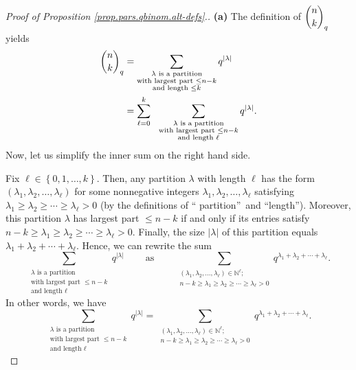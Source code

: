\begin{proof}
[Proof of Proposition \ref{prop.pars.qbinom.alt-defs}.]\textbf{(a)} The
definition of $\dbinom{n}{k}_{q}$ yields%
\begin{align}
\dbinom{n}{k}_{q}  &  =\sum_{\substack{\lambda\text{ is a partition}%
\\\text{with largest part }\leq n-k\\\text{and length }\leq k}}q^{\left\vert
\lambda\right\vert }\nonumber\\
&  =\sum_{\ell=0}^{k}\ \ \sum_{\substack{\lambda\text{ is a partition}%
\\\text{with largest part }\leq n-k\\\text{and length }\ell}}q^{\left\vert
\lambda\right\vert }. \label{pf.prop.pars.qbinom.alt-defs.a.1}%
\end{align}
Now, let us simplify the inner sum on the right hand side.

Fix $\ell\in\left\{  0,1,\ldots,k\right\}  $. Then, any partition $\lambda$
with length $\ell$ has the form $\left(  \lambda_{1},\lambda_{2}%
,\ldots,\lambda_{\ell}\right)  $ for some nonnegative integers $\lambda
_{1},\lambda_{2},\ldots,\lambda_{\ell}$ satisfying $\lambda_{1}\geq\lambda
_{2}\geq\cdots\geq\lambda_{\ell}>0$ (by the definitions of \textquotedblleft
partition\textquotedblright\ and \textquotedblleft length\textquotedblright).
Moreover, this partition $\lambda$ has largest part $\leq n-k$ if and only if
its entries satisfy $n-k\geq\lambda_{1}\geq\lambda_{2}\geq\cdots\geq
\lambda_{\ell}>0$. Finally, the size $\left\vert \lambda\right\vert $ of this
partition equals $\lambda_{1}+\lambda_{2}+\cdots+\lambda_{\ell}$. Hence, we
can rewrite the sum%
\[
\sum_{\substack{\lambda\text{ is a partition}\\\text{with largest part }\leq
n-k\\\text{and length }\ell}}q^{\left\vert \lambda\right\vert }%
\ \ \ \ \ \ \ \ \ \ \text{as}\ \ \ \ \ \ \ \ \ \ \sum_{\substack{\left(
\lambda_{1},\lambda_{2},\ldots,\lambda_{\ell}\right)  \in\mathbb{N}^{\ell
};\\n-k\geq\lambda_{1}\geq\lambda_{2}\geq\cdots\geq\lambda_{\ell}%
>0}}q^{\lambda_{1}+\lambda_{2}+\cdots+\lambda_{\ell}}.
\]
In other words, we have%
\begin{equation}
\sum_{\substack{\lambda\text{ is a partition}\\\text{with largest part }\leq
n-k\\\text{and length }\ell}}q^{\left\vert \lambda\right\vert }=\sum
_{\substack{\left(  \lambda_{1},\lambda_{2},\ldots,\lambda_{\ell}\right)
\in\mathbb{N}^{\ell};\\n-k\geq\lambda_{1}\geq\lambda_{2}\geq\cdots\geq
\lambda_{\ell}>0}}q^{\lambda_{1}+\lambda_{2}+\cdots+\lambda_{\ell}}.
\label{pf.prop.pars.qbinom.alt-defs.a.2}%
\end{equation}



\end{proof}
